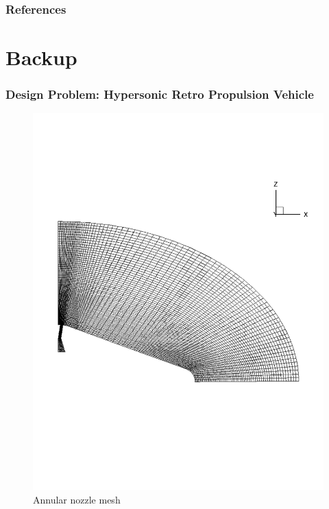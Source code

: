 \documentclass{beamer}
\begin{document}
\begin{frame}[t,allowframebreaks]
  \frametitle{References}
  \printbibliography
\end{frame}

\section*{Backup}

\begin{frame}
  \frametitle{Design Problem: Hypersonic Retro Propulsion Vehicle}
  \begin{figure}[ht]
     \begin{minipage}[b]{0.4\linewidth}
         \centering
         \includegraphics[scale=0.15,trim={0 8cm 0 8cm}]{figures/from_peter/annular_grid}
         \caption{\tiny Annular nozzle mesh}
     \end{minipage}
     \hspace{0.5cm}
     \begin{minipage}[b]{0.4\linewidth}

\end{minipage}
\end{figure}
\end{frame}
\end{document}
